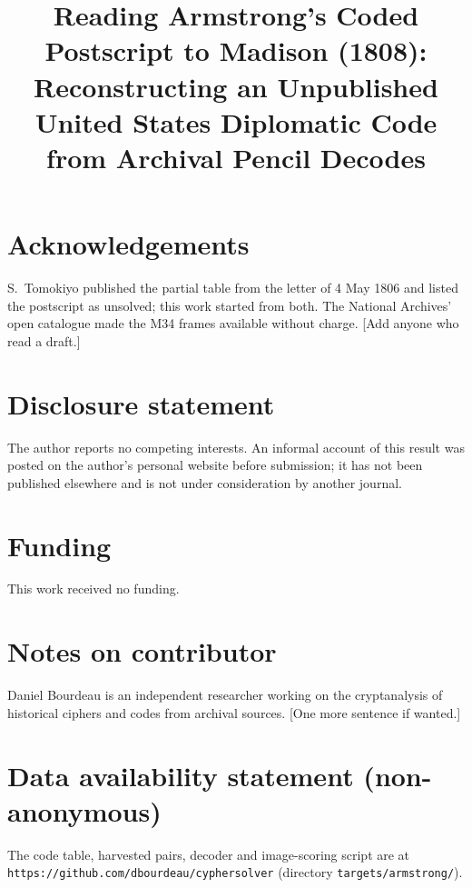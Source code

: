 \documentclass[]{interact}
\begin{document}
\title{Reading Armstrong's Coded Postscript to Madison (1808): Reconstructing an Unpublished United States Diplomatic Code from Archival Pencil Decodes}

\author{
}

\maketitle

\section*{Acknowledgements}

S.~Tomokiyo published the partial table from the letter of 4 May 1806 and listed the postscript as unsolved; this work started from both. The National Archives' open catalogue made the M34 frames available without charge. [Add anyone who read a draft.]

\section*{Disclosure statement}

The author reports no competing interests. An informal account of this result was posted on the author's personal website before submission; it has not been published elsewhere and is not under consideration by another journal.

\section*{Funding}

This work received no funding.

\section*{Notes on contributor}

Daniel Bourdeau is an independent researcher working on the cryptanalysis of historical ciphers and codes from archival sources. [One more sentence if wanted.]

\section*{Data availability statement (non-anonymous)}

The code table, harvested pairs, decoder and image-scoring script are at \texttt{https://github.com/dbourdeau/cyphersolver} (directory \texttt{targets/armstrong/}).
\end{document}
